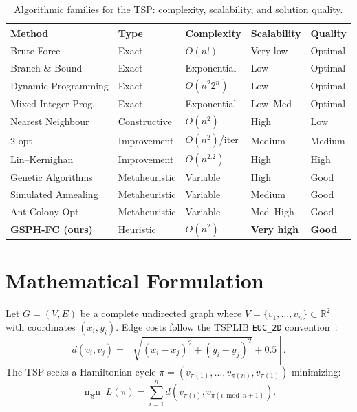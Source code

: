 \documentclass[runningheads]{llncs}
\begin{document}
\begin{table}
\caption{Algorithmic families for the TSP: complexity, scalability,
and solution quality.}\label{tab:comparison}
\centering\small
\begin{tabular}{@{}lllll@{}}
\toprule
\textbf{Method} & \textbf{Type} & \textbf{Complexity}
  & \textbf{Scalability} & \textbf{Quality} \\
\midrule
Brute Force           & Exact         & $O(n!)$           & Very low  & Optimal \\
Branch \& Bound       & Exact         & Exponential       & Low       & Optimal \\
Dynamic Programming   & Exact         & $O(n^2 2^n)$      & Low       & Optimal \\
Mixed Integer Prog.   & Exact         & Exponential       & Low--Med  & Optimal \\
\midrule
Nearest Neighbour     & Constructive  & $O(n^2)$          & High      & Low     \\
2-opt                 & Improvement   & $O(n^2)$/iter     & Medium    & Medium  \\
Lin--Kernighan        & Improvement   & $O(n^{2.2})$      & High      & High    \\
\midrule
Genetic Algorithms    & Metaheuristic & Variable          & High      & Good    \\
Simulated Annealing   & Metaheuristic & Variable          & Medium    & Good    \\
Ant Colony Opt.       & Metaheuristic & Variable          & Med--High & Good    \\
\midrule
\textbf{GSPH-FC (ours)} & Heuristic  & $O(n^2)$ & \textbf{Very high} & \textbf{Good} \\
\bottomrule
\end{tabular}
\end{table}

\section{Mathematical Formulation}
\label{sec:formulation}

Let $G=(V,E)$ be a complete undirected graph where
$V=\{v_1,\dots,v_n\}\subset\mathbb{R}^2$ with coordinates
$(x_i,y_i)$. Edge costs follow the TSPLIB \texttt{EUC\_2D}
convention~\cite{reinelt1991tsplib}:
\begin{equation}
d(v_i,v_j)=\left\lfloor\sqrt{(x_i-x_j)^2+(y_i-y_j)^2}+0.5\right\rfloor.
\label{eq:dist}
\end{equation}
The TSP seeks a Hamiltonian cycle
$\pi=(v_{\pi(1)},\dots,v_{\pi(n)},v_{\pi(1)})$ minimizing:
\begin{equation}
\min_{\pi}\;L(\pi)=\sum_{i=1}^{n}
d\!\left(v_{\pi(i)},v_{\pi(i\bmod n+1)}\right).
\label{eq:tsp}
\end{equation}
\end{document}
